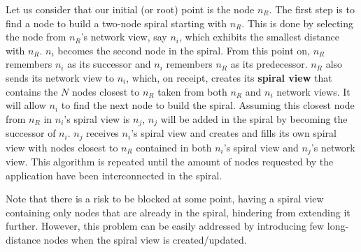 Let us consider that our initial (or root) point is the node $n_R$. The first
step is to find a node to build a two-node spiral starting with $n_R$. This is
done by selecting the node from $n_R$'s network view, say $n_i$, which exhibits
the smallest distance with $n_R$. $n_i$ becomes the second node in the
spiral. From this point on, $n_R$ remembers $n_i$ as its successor and $n_i$
remembers $n_R$ as its predecessor. $n_R$ also sends its network view to $n_i$,
which, on receipt, creates its {\bf spiral view} that contains the $N$ nodes
closest to $n_R$ taken from both $n_R$ and $n_i$ network views. It will allow
$n_i$ to find the next node to build the spiral. Assuming this closest node from
$n_R$ in $n_i$'s spiral view is $n_j$, $n_j$ will be added in the spiral by
becoming the successor of $n_i$. $n_j$ receives $n_i$'s spiral view and creates
and fills its own spiral view with nodes closest to $n_R$ contained in both
$n_i$'s spiral view and $n_j$'s network view. This algorithm is repeated until
the amount of nodes requested by the application have been interconnected in the
spiral.

Note that there is a risk to be blocked at some point, having a spiral view
containing only nodes that are already in the spiral, hindering from extending
it further. However, this problem can be easily addressed by introducing few
long-distance nodes when the spiral view is created/updated.

